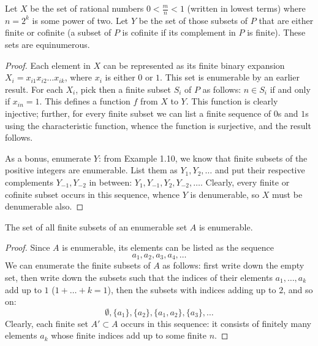 \begin{exercise}[1.5]
  Let $X$ be the set of rational numbers $0 < \frac{m}{n} < 1$ (written in lowest terms) where $n = 2^k$ is some power of two.
  Let $Y$ be the set of those subsets of $P$ that are either finite or cofinite (a subset of $P$ is cofinite if its complement in $P$ is finite).
  These sets are equinumerous.
\end{exercise}
\begin{proof}
  Each element in $X$ can be represented as its finite binary expansion $X_i = x_{i1}x_{i2}\ldots x_{ik}$, where $x_i$ is either $0$ or $1$. This set is enumerable by an earlier result.
  For each $X_i$, pick then a finite subset $S_i$ of $P$ as follows: $n \in S_i$ if and only if $x_{in} = 1$.
  This defines a function $f$ from $X$ to $Y$.
  This function is clearly injective; further, for every finite subset we can list a finite sequence of $0$s and $1$s using the characteristic function, whence the function is surjective, and the result follows.

  As a bonus, enumerate $Y$: from Example 1.10, we know that finite subsets of the positive integers are enumerable.
  List them as $Y_1,Y_2, \ldots$ and put their respective complements $Y_{-1}, Y_{-2}$ in between: $Y_1, Y_{-1}, Y_2, Y_{-2}, \ldots$.
  Clearly, every finite or cofinite subset occurs in this sequence, whence $Y$ is denumerable, so $X$ must be denumerable also.
\end{proof}

\begin{exercise}[1.6]
  The set of all finite subsets of an enumerable set $A$ is enumerable.
\end{exercise}
\begin{proof}
  Since $A$ is enumerable, its elements can be listed as the sequence
  \begin{equation*}
    a_1, a_2, a_3, a_4, \ldots
  \end{equation*}
  We can enumerate the finite subsets of $A$ as follows: first write down the empty set, then write down the subsets such that the indices of their elements $a_1, \ldots, a_k$ add up to $1$ ($1 + \ldots + k = 1$), then the subsets with indices adding up to $2$, and so on:
  \begin{equation*}
    \emptyset, \{a_1\}, \{a_2\}, \{a_1, a_2\}, \{a_3\}, \ldots
  \end{equation*}
  Clearly, each finite set $A' \subset A$ occurs in this sequence: it consists of finitely many elements $a_k$ whose finite indices add up to some finite $n$.
\end{proof}

